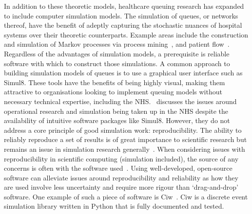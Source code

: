 In addition to these theoretic models, healthcare queuing research has expanded
to include computer simulation models. The simulation of queues, or networks
thereof, have the benefit of adeptly capturing the stochastic nuances of
hospital systems over their theoretic counterparts. Example areas include the
construction and simulation of Markov processes via process
mining~\cite{Arnolds2018,Rebuge2012}, and patient flow~\cite{Bhattacharjee2014}.
Regardless of the advantages of simulation models, a prerequisite is reliable
software with which to construct those simulations. A common approach to
building simulation models of queues is to use a graphical user interface such
as Simul8. These tools have the benefits of being highly visual, making them
attractive to organisations looking to implement queuing models without
necessary technical expertise, including the NHS.~\cite{Brailsford2013}
discusses the issues around operational research and simulation being taken up
in the NHS despite the availability of intuitive software packages like Simul8.
However, they do not address a core principle of good simulation work:
reproducibility. The ability to reliably reproduce a set of results is of great
importance to scientific research but remains an issue in simulation research
generally~\cite{Fitzpatrick2019}. When considering issues with reproducibility
in scientific computing (simulation included), the source of any concerns is
often with the software used~\cite{Ivie2018}. Using well-developed, open-source
software can alleviate issues around reproducibility and reliability as how they
are used involve less uncertainty and require more rigour than ‘drag-and-drop’
software. One example of such a piece of software is Ciw~\cite{Palmer2019}. Ciw
is a discrete event simulation library written in Python that is fully
documented and tested. 
